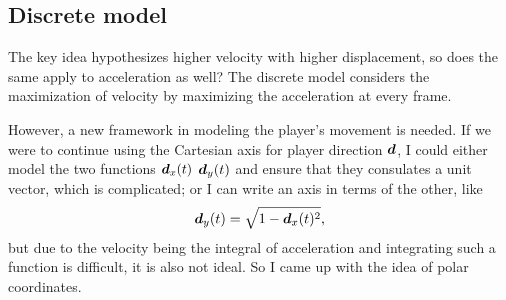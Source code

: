 \subsection{Discrete model}
The key idea hypothesizes higher velocity with higher displacement, so does the same apply to acceleration as well? The discrete model considers the maximization of velocity by maximizing the acceleration at every frame.

However, a new framework in modeling the player's movement is needed. If we were to continue using the Cartesian axis for player direction $\boldsymbol{d}$, I could either model the two functions $\boldsymbol{d}_x(t)$ $\boldsymbol{d}_y(t)$ and ensure that they consulates a unit vector, which is complicated; or I can write an axis in terms of the other, like
\[
    \boldsymbol{d}_y(t) = \sqrt{1-\boldsymbol{d}_x(t)^2},
\]
but due to the velocity being the integral of acceleration and integrating such a function is difficult, it is also not ideal. So I came up with the idea of polar coordinates.



